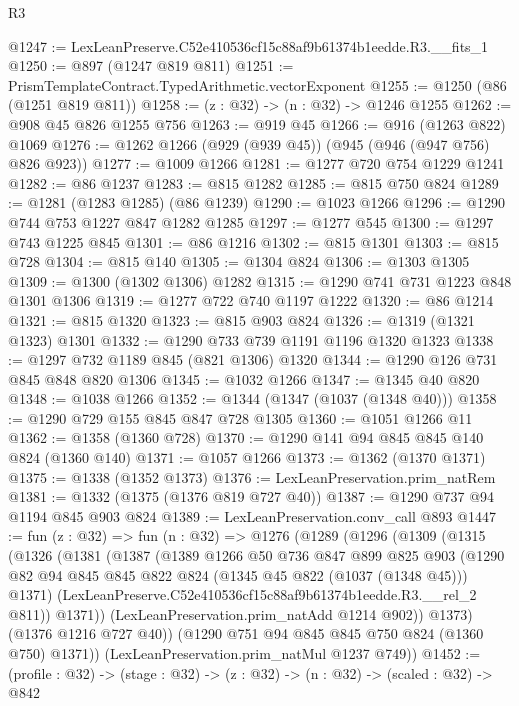 \begin{lexlean}{R3}
\begin{coremodule}
@1247 := LexLeanPreserve.C52e410536cf15c88af9b61374b1eedde.R3.__fits_1
@1250 := @897 (@1247 @819 @811)
@1251 := PrismTemplateContract.TypedArithmetic.vectorExponent
@1255 := @1250 (@86 (@1251 @819 @811))
@1258 := (z : @32) -> (n : @32) -> @1246 @1255
@1262 := @908 @45 @826 @1255 @756
@1263 := @919 @45
@1266 := @916 (@1263 @822) @1069
@1276 := @1262 @1266 (@929 (@939 @45)) (@945 (@946 (@947 @756) @826 @923))
@1277 := @1009 @1266
@1281 := @1277 @720 @754 @1229 @1241
@1282 := @86 @1237
@1283 := @815 @1282
@1285 := @815 @750 @824
@1289 := @1281 (@1283 @1285) (@86 @1239)
@1290 := @1023 @1266
@1296 := @1290 @744 @753 @1227 @847 @1282 @1285
@1297 := @1277 @545
@1300 := @1297 @743 @1225 @845
@1301 := @86 @1216
@1302 := @815 @1301
@1303 := @815 @728
@1304 := @815 @140
@1305 := @1304 @824
@1306 := @1303 @1305
@1309 := @1300 (@1302 @1306) @1282
@1315 := @1290 @741 @731 @1223 @848 @1301 @1306
@1319 := @1277 @722 @740 @1197 @1222
@1320 := @86 @1214
@1321 := @815 @1320
@1323 := @815 @903 @824
@1326 := @1319 (@1321 @1323) @1301
@1332 := @1290 @733 @739 @1191 @1196 @1320 @1323
@1338 := @1297 @732 @1189 @845 (@821 @1306) @1320
@1344 := @1290 @126 @731 @845 @848 @820 @1306
@1345 := @1032 @1266
@1347 := @1345 @40 @820
@1348 := @1038 @1266
@1352 := @1344 (@1347 (@1037 (@1348 @40)))
@1358 := @1290 @729 @155 @845 @847 @728 @1305
@1360 := @1051 @1266 @11
@1362 := @1358 (@1360 @728)
@1370 := @1290 @141 @94 @845 @845 @140 @824 (@1360 @140)
@1371 := @1057 @1266
@1373 := @1362 (@1370 @1371)
@1375 := @1338 (@1352 @1373)
@1376 := LexLeanPreservation.prim_natRem
@1381 := @1332 (@1375 (@1376 @819 @727 @40))
@1387 := @1290 @737 @94 @1194 @845 @903 @824
@1389 := LexLeanPreservation.conv_call @893
@1447 := fun (z : @32) =>
  fun (n : @32) =>
  @1276
    (@1289
      (@1296
        (@1309
          (@1315
            (@1326
              (@1381
                (@1387
                  (@1389
                    @1266
                    @50
                    @736
                    @847
                    @899
                    @825
                    @903
                    (@1290 @82 @94 @845 @845 @822 @824 (@1345 @45 @822 (@1037 (@1348 @45))) @1371)
                    (LexLeanPreserve.C52e410536cf15c88af9b61374b1eedde.R3.__rel_2 @811))
                  @1371))
              (LexLeanPreservation.prim_natAdd @1214 @902))
            @1373)
          (@1376 @1216 @727 @40))
        (@1290 @751 @94 @845 @845 @750 @824 (@1360 @750) @1371))
      (LexLeanPreservation.prim_natMul @1237 @749))
@1452 := (profile : @32) -> (stage : @32) -> (z : @32) -> (n : @32) -> (scaled : @32) -> @842

\end{coremodule}
\end{lexlean}
